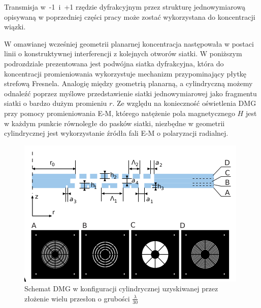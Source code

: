 Transmisja w~-1~i~+1 rzędzie dyfrakcyjnym przez strukturę jednowymiarową opisywaną w poprzedniej części pracy może zostać wykorzystana do koncentracji wiązki. 

W omawianej wcześniej geometrii planarnej koncentracja następowała w postaci linii o konstruktywnej interferencji z kolejnych otworów siatki. W poniższym podrozdziale prezentowana jest podwójna siatka dyfrakcyjna, która do koncentracji promieniowania wykorzystuje mechanizm przypominający płytkę strefową Fresnela. Analogię między geometrią planarną, a cylindryczną możemy odnaleźć poprzez myślowe przedstawienie siatki jednowymiarowej jako fragmentu siatki o bardzo dużym promieniu $r$. Ze względu na konieczność oświetlenia DMG przy pomocy promieniowania E-M, którego natężenie pola magnetycznego $H$ jest w każdym punkcie równoległe do pasków siatki, niezbędne w geometrii cylindrycznej jest wykorzystanie źródła fali E-M o polaryzacji radialnej. 

\begin{figure}
	\includegraphics[width=\textwidth]{images/dmg/express_siatki.png}
	\caption{Schemat DMG w konfiguracji cylindrycznej uzyskiwanej przez złożenie wielu przesłon o grubości $\frac{\lambda}{30}$ \cite{Yavorskiy:14}}
	\label{fig:schem-cyl}
\end{figure}


